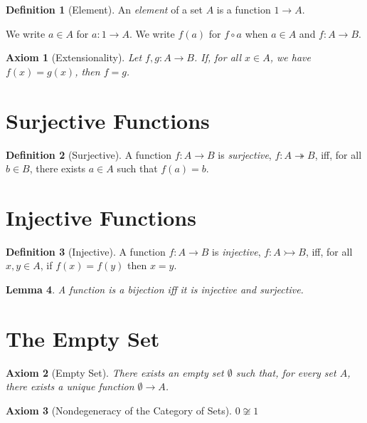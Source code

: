 \documentclass{book}
\newtheorem{lm}{Lemma}[chapter]
\newtheorem{ax}{Axiom}
\theoremstyle{definition}
\newtheorem{df}[lm]{Definition}
\begin{document}
  \begin{df}[Element]
    An \emph{element} of a set $A$ is a function $1 \rightarrow A$.
    
    We write $a \in A$ for $a : 1 \rightarrow A$.  We write $f(a)$ for $f \circ 
    a$ 
    when $a \in A$ and $f : A \rightarrow B$.
  \end{df}
  
  \begin{ax}[Extensionality]
    Let $f, g : A \rightarrow B$. If, for all $x \in A$, we have $f(x) = g(x)$, 
    then $f = g$.
  \end{ax}
  
  \section{Surjective Functions}
  
  \begin{df}[Surjective]
    A function $f : A \rightarrow B$ is \emph{surjective}, $f : A 
    \twoheadrightarrow B$, iff, for all $b \in B$, there exists $a \in A$ such 
    that 
    $f(a) = b$.
  \end{df}
  
  \section{Injective Functions}
  
  \begin{df}[Injective]
    A function $f : A \rightarrow B$ is \emph{injective}, $f : A 
    \rightarrowtail 
    B$, iff, for all $x, y \in A$, if $f(x) = f(y)$ then $x = y$.
  \end{df}
  
  \begin{lm}
    A function is a bijection iff it is injective and surjective.
  \end{lm}
  
  
  \section{The Empty Set}
  
  \begin{ax}[Empty Set]
    There exists an \emph{empty} set $\emptyset$ such that, for every set $A$, 
    there exists a unique function $\emptyset \rightarrow A$.
  \end{ax}
  
  \begin{ax}[Nondegeneracy of the Category of Sets]
    $0 \not\cong 1$
  \end{ax}
  
\end{document}
